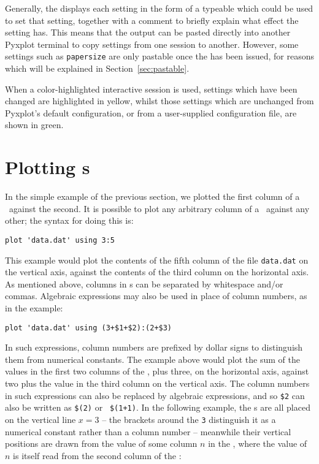 Generally, the  displays each setting in the form of a typeable
 which could be used to set that setting, together with a comment
to briefly explain what effect the setting has. This means that the output can
be pasted directly into another Pyxplot terminal to copy settings from one
session to another. However, some settings such as {\tt papersize} are only
pastable once the  has been issued, for reasons
which will be explained in Section~\ref{sec:pastable}.

When a color-highlighted interactive session is used, settings which have been
changed are highlighted in yellow, whilst those settings which are unchanged
from Pyxplot's default configuration, or from a user-supplied configuration
file, are shown in green.

\section{Plotting \datafile s}
\label{sec:plot_datafiles}

In the simple example of the previous section, we plotted the first column of a
\datafile\ against the second. It is possible to plot any arbitrary column of a
\datafile\ against any other; the syntax for doing this is:

\begin{verbatim}
plot 'data.dat' using 3:5
\end{verbatim}

\noindent This example would plot the contents of the fifth column of the file
{\tt data.dat} on the vertical axis, against the contents of the third column
on the horizontal axis. As mentioned above, columns in \datafile s can be
separated by whitespace and/or commas.  Algebraic expressions may also be used
in place of column numbers, as in the example:

\begin{verbatim}
plot 'data.dat' using (3+$1+$2):(2+$3)
\end{verbatim}

\noindent In such expressions, column numbers are prefixed by dollar signs to
distinguish them from numerical constants. The example above would plot the sum
of the values in the first two columns of the \datafile, plus three, on the
horizontal axis, against two plus the value in the third column on the vertical
axis. The column numbers in such expressions can also be replaced by algebraic
expressions, and so {\tt \$2} can also be written as {\tt \$(2)} or {\tt
\$(1+1)}. In the following example, the \datapoint s are all placed on the
vertical line $x=3$ -- the brackets around the {\tt 3} distinguish it as a
numerical constant rather than a column number -- meanwhile their vertical
positions are drawn from the value of some column $n$ in the \datafile, where
the value of $n$ is itself read from the second column of the \datafile:

